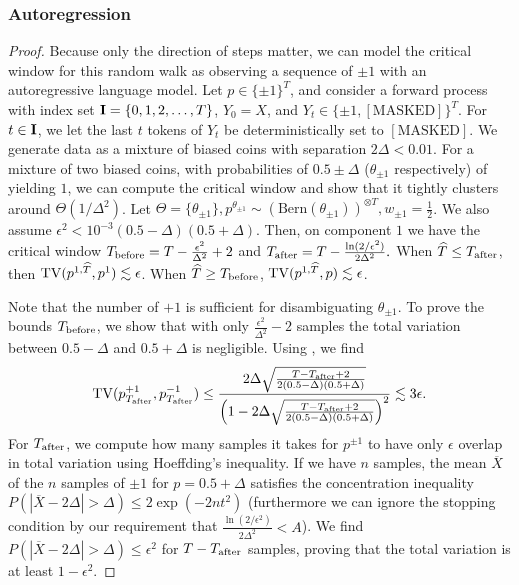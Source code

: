 \subsubsection{Autoregression}\label{app:autoregression}
\arbinomialbiased*
\begin{proof}
Because only the direction of steps matter, we can model the critical window for this random walk as observing a sequence of $\pm 1$ with an autoregressive language model. Let $p \in \{\pm 1\}^T$, and consider a forward process with index set $\mathbf{I}=\{0,1,2,\dots,T\}$, $Y_0=X$, and $Y_t \in \{\pm 1,\mathrm{[MASKED]}\}^T$. For $t \in \mathbf{I}$, we let the last $t$ tokens of $Y_t$ be deterministically set to $\mathrm{[MASKED]}$. We generate data as a mixture of biased coins with separation $2\Delta < 0.01.$ For a mixture of two biased coins, with probabilities of $0.5 \pm \Delta$ ($\theta_{\pm 1}$ respectively) of yielding $1$, we can compute the critical window and show that it tightly clusters around $\Theta(1/\Delta^2)$. Let $\Theta=\{\theta_{\pm 1}\},  p^{\theta_{\pm 1}} \sim (\textrm{Bern}(\theta_{\pm 1}))^{\otimes T}, w_{\pm 1}=\frac{1}{2}$. We also assume $\epsilon^2 < 10^{-3}(0.5-\Delta)(0.5+\Delta)$. Then, on component $1$ we have the critical window $T_{\mathrm{before}}= T-\frac{\epsilon^2}{\Delta^2}+2$ and $T_{\mathrm{after}}  = T-\frac{\ln (2/\epsilon^2)}{2\Delta^2}.$ When $\widehat{T} \leq T_{\mathrm{after}}$, then $\TV(\modrevlaw{1}{\wh{T}}{},p^1) \lesssim \epsilon$. When $\widehat{T} \geq T_{\mathrm{before}}$, $\TV(\modrevlaw{1}{\wh{T}}{},p)\lesssim \epsilon$. 

Note that the number of $+1$ is sufficient for disambiguating $\theta_{\pm 1}$. To prove the bounds $T_{\mathrm{before}}$, we show that with only $\frac{\epsilon^2}{\Delta^2}-2$ samples the total variation between $0.5-\Delta$ and $0.5+\Delta$ is negligible. Using  \cite{doi:10.1137/S0040585X9797821X}, we find
\begin{align*}
\mathrm{TV}(p^{+1}_{T_{\mathrm{after}}},p^{-1}_{T_{\mathrm{after}}}) \leq \frac{2\Delta \sqrt{\frac{T-T_{\mathrm{after}}+2}{2(0.5-\Delta)(0.5+\Delta)}}}{\left(1-2\Delta \sqrt{\frac{T-T_{\mathrm{after}}+2}{2(0.5-\Delta)(0.5+\Delta)}}\right)^2} \lesssim 3\epsilon.
\end{align*}
For $T_{\mathrm{after}}$, we compute how many samples it takes for $p^{\pm 1}$ to have only $\epsilon$ overlap in total variation using Hoeffding's inequality. If we have $n$ samples, the mean $\overline{X}$ of the $n$ samples of $\pm1$ for $p=0.5+\Delta$ satisfies the concentration inequality $P(|\overline{X} - 2\Delta|>\Delta) \leq 2\exp(-2nt^2)$ (furthermore we can ignore the stopping condition by our requirement that  $\frac{\ln (2/\epsilon^2)}{2\Delta^2} < A$). We find $P(|\overline{X} - 2\Delta|>\Delta)  \leq \epsilon^2$ for $T-T_{\mathrm{after}}$ samples, proving that the total variation is at least $1-\epsilon^2$. 
\end{proof}

